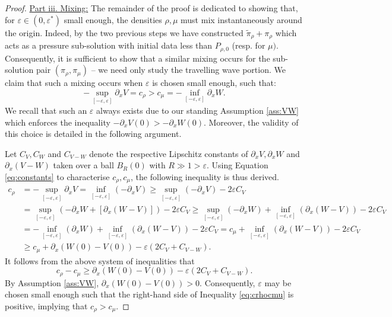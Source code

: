 \documentclass[a4paper,twosided, 11pt]{article}
\newcommand {\e}  {\varepsilon}
\theoremstyle{plain}
\theoremstyle{remark}
\numberwithin{equation}{section}
\begin{document}
\begin{proof}
\underline{Part iii. Mixing:}
The remainder of the proof is dedicated to showing that, for $\e \in (0,\e^\ast)$ small enough, the densities $\rho,\mu$ must mix instantaneously around the origin. 
Indeed, by the two previous steps we have constructed $\tilde{\pi}_\rho + \pi_\rho$ which acts as a pressure sub-solution with initial data less than $P_{\rho,0}$ (resp. for $\mu)$.
Consequently, it is sufficient to show that a similar mixing occurs for the sub-solution pair $(\pi_\rho,\pi_\mu)$  -- we need only study the travelling wave portion. 
We claim that such a mixing occurs when $\e$ is chosen small enough, such that:
\begin{equation}\label{eq:constantsineq}
   - \sup_{[-\e,\e]} \partial_x V =  c_\rho > c_\mu =  - \inf_{[-\e,\e]} \partial_x W.
\end{equation}
We recall that such an $\e$ always exists due to our standing Assumption \ref{ass:VW} which enforces the inequality $-\partial_xV(0) > - \partial_x W(0)$.
Moreover, the validity of this choice is detailed in the following argument.

\medskip 

Let $C_{V},C_{W}$ and $C_{V-W}$ denote the respective Lipschitz constants of $\partial_xV,\partial_x W $ and $\partial_x(V-W)$ taken over a ball $B_R(0)$ with $R \gg 1 > \e $. 
Using Equation \eqref{eq:constants} to characterise $c_\rho,c_\mu$, the following inequality is thus derived. 
\begin{align*}
c_\rho & =  - \sup_{[-\e,\e]} \partial_x V  = \inf_{[-\e,\e ]}\left( -\partial_x V\right) \geq \sup_{[-\e,\e ]} \left(-\partial_x V\right) - 2\e C_{V} \\
& = \sup_{[-\e,\e ]} \left(-\partial_x W + [\partial_x(W- V)]\right) - 2\e C_{V}  \geq \sup_{[-\e,\e ]} \left(-\partial_x W\right)  + \inf_{[-\e,\e ]}(\partial_x(W-V)) - 2\e C_{V} \\
& =  - \inf_{[-\e,\e ]} \left(\partial_x W\right)  + \inf_{[-\e,\e ]}(\partial_x(W-V)) - 2\e C_{V}  =  c_\mu + \inf_{[-\e,\e ]}(\partial_x(W-V)) - 2\e C_{V} \\
& \geq c_\mu + \partial_x(W(0)- V(0)) - \e (2C_{V} + C_{V-W}).
\end{align*}
It follows from the above system of inequalities that 
\begin{equation}\label{eq:crhocmu}
    c_\rho -c_\mu \geq \partial_x(W(0)- V(0)) - \e (2C_{V} + C_{V-W}).
\end{equation}
By Assumption \ref{ass:VW}, $\partial_x(W(0)- V(0)) > 0$. 
Consequently, $\e$ may be chosen small enough such that the right-hand side of Inequality \eqref{eq:crhocmu} is positive,  implying that $c_\rho > c_\mu$. 


\end{proof}
\end{document}
